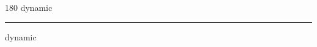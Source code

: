 
\begin{frame}
\begin{center}
\begin{turn}{180}
{\fontsize{2.5cm}{1em}\selectfont dynamic}
\end{turn}
\vspace{1em}\par  
\hrule
\vspace{1em}\par  
{\fontsize{2.5cm}{1em}\selectfont dynamic}
\end{center}
\end{frame}
